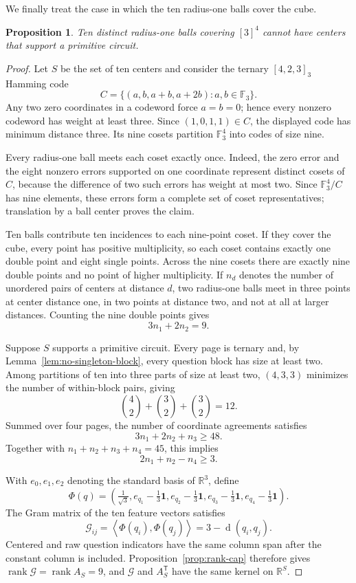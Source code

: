 \documentclass[11pt]{article}
\newtheorem{proposition}[theorem]{Proposition}
\theoremstyle{definition}
\theoremstyle{remark}
\newcommand{\F}{\mathbb{F}}
\newcommand{\R}{\mathbb{R}}
\newcommand{\one}{\mathbf{1}}
\newcommand{\rank}{\operatorname{rank}}
\newcommand{\dist}{\operatorname{d}}
\newcommand{\inner}[2]{\left\langle #1,#2\right\rangle}
\numberwithin{equation}{section}
\begin{document}
We finally treat the case in which the ten radius-one balls cover the cube.

\begin{proposition}\label{prop:ten-cover}
Ten distinct radius-one balls covering \([3]^4\) cannot have centers that
support a primitive circuit.
\end{proposition}

\begin{proof}
Let \(S\) be the set of ten centers and consider the ternary \([4,2,3]_3\)
Hamming code
\[
  C=\{(a,b,a+b,a+2b):a,b\in\F_3\}.
\]
Any two zero coordinates in a codeword force \(a=b=0\); hence every nonzero
codeword has weight at least three.  Since \((1,0,1,1)\in C\), the displayed
code has minimum distance three.  Its nine cosets partition \(\F_3^4\) into
codes of size nine.

Every radius-one ball meets each coset exactly once.  Indeed, the zero error
and the eight nonzero errors supported on one coordinate represent distinct
cosets of \(C\), because the difference of two such errors has weight at most
two.  Since \(\F_3^4/C\) has nine elements, these errors form a complete set
of coset representatives; translation by a ball center proves the claim.

Ten balls contribute ten incidences to each nine-point coset.  If they cover
the cube, every point has positive multiplicity, so each coset contains
exactly one double point and eight single points.  Across the nine cosets
there are exactly nine double points and no point of higher multiplicity.  If
\(n_d\) denotes the number of unordered pairs of centers at distance \(d\),
two radius-one balls meet in three points at center distance one, in two
points at distance two, and not at all at larger distances.  Counting the
nine double points gives
\begin{equation}\label{eq:intersection-app}
  3n_1+2n_2=9.
\end{equation}

Suppose \(S\) supports a primitive circuit.  Every page is ternary and,
by Lemma~\ref{lem:no-singleton-block}, every question block has size at least
two.  Among partitions of ten into three parts of size at least two,
\((4,3,3)\) minimizes the number of within-block pairs, giving
\[
  \binom42+\binom32+\binom32=12.
\]
Summed over four pages, the number of coordinate agreements satisfies
\[
  3n_1+2n_2+n_3
  \geq48.
\]
Together with \(n_1+n_2+n_3+n_4=45\), this implies
\[
  2n_1+n_2-n_4
  \geq3.
\]

With \(e_0,e_1,e_2\) denoting the standard basis of \(\R^3\), define
\[
  \Phi(q)=
  \left(
  \tfrac1{\sqrt3},
  e_{q_1}-\tfrac13\one,
  e_{q_2}-\tfrac13\one,
  e_{q_3}-\tfrac13\one,
  e_{q_4}-\tfrac13\one
  \right).
\]
The Gram matrix of the ten feature vectors satisfies
\[
  \mathcal G_{ij}
  =
  \inner{\Phi(q_i)}{\Phi(q_j)}
  =
  3-\dist(q_i,q_j).
\]
Centered and raw question indicators have the same column span after the
constant column is included.  Proposition~\ref{prop:rank-cap} therefore gives
\(\rank \mathcal G=\rank A_S=9\), and \(\mathcal G\) and
\(A_S^{\mathsf T}\) have the same
kernel on \(\R^S\).


\end{proof}
\end{document}

